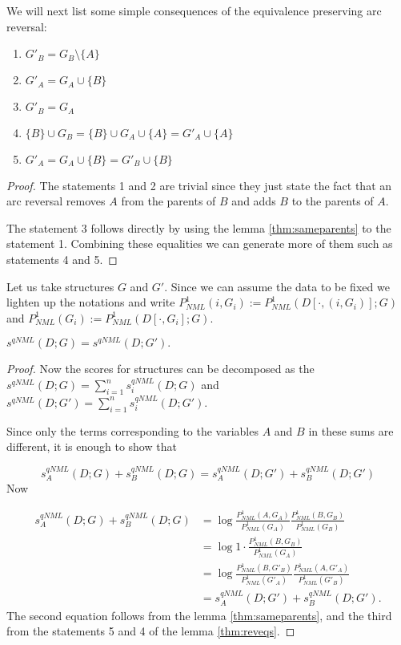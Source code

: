 We will next list some simple consequences of the equivalence preserving
arc reversal:

\begin{lemma}
\label{thm:reveqs}
\hangindent\leftmargini
\hspace{1mm}
\begin{enumerate}
\item $G'_{B}=G_{B}\setminus\{A\}$
\item $G'_{A}=G_{A}\cup\{B\}$ 
\item $G'_{B}=G_{A}$
\item $\{B\}\cup G_{B}=\{B\}\cup G_{A}\cup\{A\}=G'_{A}\cup\{A\}$
\item $G'_{A}=G_{A}\cup\{B\}=G'_{B}\cup\{B\}$
\end{enumerate}
\end{lemma}


\begin{proof}

The statements 1 and 2 are trivial since they just state the fact
that an arc reversal removes $A$ from the parents of $B$ and adds
$B$ to the parents of $A$. 

The
statement 3 follows directly by using the lemma \ref{thm:sameparents}
to the statement 1. Combining these equalities we can generate more of them 
such as statements 4 and 5. 
\end{proof}

Let us take structures $G$ and $G'$. Since we can assume the data to be fixed we lighten
up the notations and write 
$P^1_{NML}(i,G_i) := P^1_{NML}(D[\cdot,(i,G_i)];G)$ and
$P^1_{NML}(G_i) := P^1_{NML}(D[\cdot,G_i];G)$.

\begin{theorem}
$  s^{qNML}(D;G)=s^{qNML}(D;G').$
\end{theorem}

\begin{proof}

  Now the scores for structures can be decomposed as the
  $s^{qNML}(D;G)=\sum_{i=1}^{n}s_i^{qNML}(D;G)$ and 
  $s^{qNML}(D;G')=\sum_{i=1}^{n}s_i^{qNML}(D;G')$.

Since only the terms corresponding to the variables $A$ and $B$
in these sums are different, it is enough to show that

$$
s_A^{qNML}(D;G)+s_B^{qNML}(D;G) = s_A^{qNML}(D;G')+s_B^{qNML}(D;G')
$$
Now 

\begin{align*}
s_A^{qNML}(D;G)+s_B^{qNML}(D;G)& =\log\frac{P^1_{NML}(A,G_{A})}{P^1_{NML}(G_{A})}\frac{P^1_{NML}(B,G_{B})}{P^1_{NML}(G_{B})}\\
 & =\log 1\cdot\frac{P^1_{NML}(B,G_{B})}{P^1_{NML}(G_{A})}\\
 & =\log \frac{P^1_{NML}(B,G'_{B})}{P^1_{NML}(G'_{A})}\frac{P^1_{NML}(A,G'_{A})}{P^1_{NML}(G'_{B})}\\
 & =s_A^{qNML}(D;G')+s_B^{qNML}(D;G').
\end{align*}
The second equation follows from the lemma \ref{thm:sameparents}, and the third from
the statements 5 and 4 of the lemma \ref{thm:reveqs}.
\end{proof}
